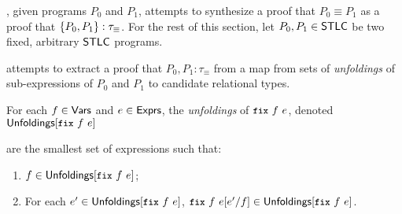% 
\sys, given programs $P_0$ and $P_1$, attempts to synthesize a proof
that $P_0 \equiv P_1$ as a proof that $\{  P_0, P_1  \} :
\tau_{\equiv}$.
%
For the rest of this section, let $P_0, P_1 \in \mathsf{STLC}$ be two fixed,
arbitrary $\mathsf{STLC}$ programs.

\sys attempts to extract a proof that $P_0, P_1 : \tau_{\equiv}$ from
a map from sets of \emph{unfoldings} of sub-expressions of $P_0$
and $P_1$ to candidate relational types.
%
\begin{defn}
  \label{defn:unfoldings}
  For each $f \in \mathsf{Vars}$ and $e \in \mathsf{Exprs}$, the \emph{unfoldings} of
  $\fix{f}{e}$, denoted $\unfoldings{ \fix{f}{e} }$

 are the smallest set of expressions such that:
  \begin{enumerate}
  \item $f \in \unfoldings{ \fix{f}{e} }$;
  \item For each $e' \in \unfoldings{ \fix{f}{e} }$, $\replace{
      \fix{f}{e} }{ f }{ e' } \in \unfoldings{ \fix{f}{e} }$.
  \end{enumerate}
\end{defn}
%
%

